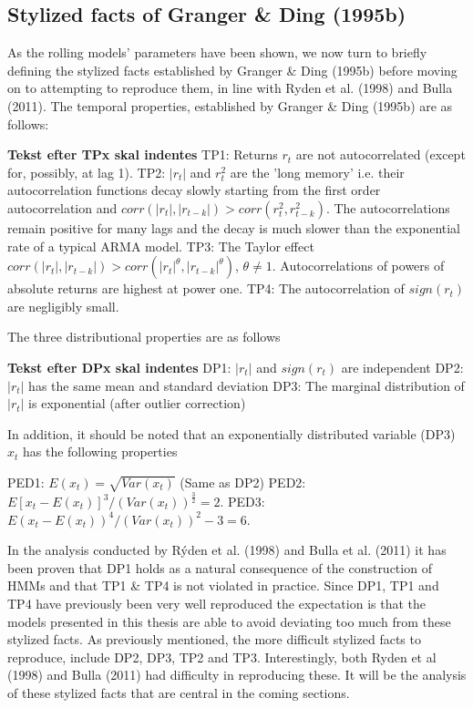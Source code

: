 \subsection{Stylized facts of Granger \& Ding (1995b)}
\label{section:stylized_facts_GD}

As the rolling models' parameters have been shown, we now turn to briefly defining the stylized facts established by Granger \& Ding (1995b) before moving on to attempting to reproduce them, in line with Ryden et al. (1998) and Bulla (2011). The temporal properties, established by Granger \& Ding (1995b) are as follows: 

\textbf{Tekst efter TPx skal indentes \newline}
TP1: Returns $r_t$ are not autocorrelated (except for, possibly, at lag 1). \newline
TP2: $|r_t|$ and $r_t^2$ are the 'long memory' i.e. their autocorrelation functions decay slowly starting from the first order autocorrelation and $corr(|r_t|, |r_{t-k}|) > corr(r_t^2, r^2_{t-k})$. The autocorrelations remain positive for many lags and the decay is much slower than the exponential rate of a typical ARMA model. \newline
TP3: The Taylor effect $corr(|r_t|, |r_{t-k}|) > corr(|r_t|^{\theta}, |r_{t-k}|^{\theta})$, $\theta \neq 1$. Autocorrelations of powers of absolute returns are highest at power one. \newline
TP4: The autocorrelation of $sign(r_t)$ are negligibly small.

The three distributional properties are as follows

\textbf{Tekst efter DPx skal indentes \newline}
DP1: $|r_t|$ and $sign(r_t)$ are independent\newline
DP2: $|r_t|$ has the same mean and standard deviation \newline
DP3: The marginal distribution of $|r_t|$ is exponential (after outlier correction)

In addition, it should be noted that an exponentially distributed variable (DP3) $x_t$ has the following properties

PED1: $E(x_t) = \sqrt{Var(x_t)}$ (Same as DP2) \newline
PED2: $E[x_t-E(x_t)]^3 / (Var(x_t))^{\frac{3}{2}} = 2.$ \newline
PED3: $E(x_t-E(x_t))^4 / (Var(x_t))^{2} -3 = 6.$

In the analysis conducted by Rýden et al. (1998) and Bulla et al. (2011) it has been proven that DP1 holds as a natural consequence of the construction of HMMs and that TP1 \& TP4 is not violated in practice. Since DP1, TP1 and TP4 have previously been very well reproduced the expectation is that the models presented in this thesis are able to avoid deviating too much from these stylized facts. As previously mentioned, the more difficult stylized facts to reproduce, include DP2, DP3, TP2 and TP3. Interestingly, both Ryden et al (1998) and Bulla (2011) had difficulty in reproducing these. It will be the analysis of these stylized facts that are central in the coming sections.

